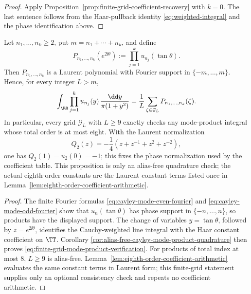 \begin{proof}
Apply Proposition~\ref{prop:finite-grid-coefficient-recovery} with \(k=0\).
The last sentence follows from the Haar-pullback identity
\eqref{eq:weighted-integral} and the phase identification above.
\end{proof}

\begin{proposition}%
\label{prop:eighth-order-finite-phase-verification}
Let \(n_1,\ldots,n_k\ge2\), put \(m=n_1+\cdots+n_k\), and define
\[
P_{n_1,\ldots,n_k}(e^{2\ii\theta})
:=\prod_{j=1}^{k}u_{n_j}(\tan\theta).
\]
Then \(P_{n_1,\ldots,n_k}\) is a Laurent polynomial with Fourier support in
\(\{-m,\ldots,m\}\).  Hence, for every integer \(L>m\),
\begin{equation}\label{eq:finite-grid-mode-product-verification}
\int_{\RR}\prod_{j=1}^{k}u_{n_j}(y)\,
\frac{\dd y}{\pi(1+y^2)}
=
\frac1L\sum_{\zeta\in\mathcal G_L}P_{n_1,\ldots,n_k}(\zeta).
\end{equation}
In particular, every grid \(\mathcal G_L\) with \(L\ge9\) exactly checks any
mode-product integral whose total order is at most eight.  With the Laurent
normalization
\[
Q_2(z)=-\frac14(z+z^{-1}+z^2+z^{-2}),
\]
one has \(Q_2(1)=u_2(0)=-1\); this fixes the phase normalization used by the
coefficient table.  This proposition is only an alias-free quadrature check;
the actual eighth-order constants are the Laurent constant terms listed once
in Lemma~\ref{lem:eighth-order-coefficient-arithmetic}.
\end{proposition}

\begin{proof}
The finite Fourier formulas
\eqref{eq:cayley-mode-even-fourier} and
\eqref{eq:cayley-mode-odd-fourier} show that \(u_n(\tan\theta)\) has phase
support in \(\{-n,\ldots,n\}\), so products have the displayed support.
The change of variables \(y=\tan\theta\), followed by
\(z=e^{2\ii\theta}\), identifies the Cauchy-weighted line integral with the
Haar constant coefficient on \(\TT\).  Corollary
\ref{cor:alias-free-cayley-mode-product-quadrature} then proves
\eqref{eq:finite-grid-mode-product-verification}.  For products of total
index at most \(8\), \(L\ge9\) is alias-free.
Lemma~\ref{lem:eighth-order-coefficient-arithmetic} evaluates the same
constant terms in Laurent form; this finite-grid statement supplies only an
optional consistency check and repeats no coefficient arithmetic.
\end{proof}
